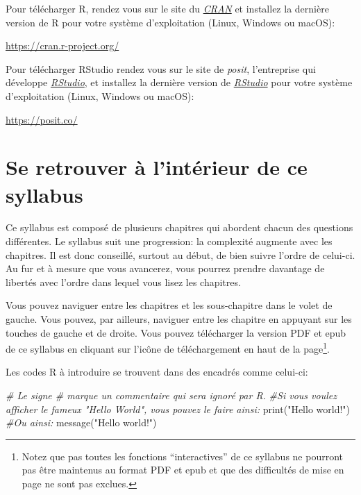 \documentclass[
]{book}
\newenvironment{Shaded}{\begin{snugshade}}{\end{snugshade}}
\newcommand{\CommentTok}[1]{\textcolor[rgb]{0.56,0.35,0.01}{\textit{#1}}}
\newcommand{\FunctionTok}[1]{\textcolor[rgb]{0.00,0.00,0.00}{#1}}
\newcommand{\NormalTok}[1]{#1}
\newcommand{\StringTok}[1]{\textcolor[rgb]{0.31,0.60,0.02}{#1}}
\begin{document}
Pour télécharger R, rendez vous sur le site du \href{https://cran.r-project.org/}{\emph{CRAN}} et installez la dernière version de R pour votre système d'exploitation (Linux, Windows ou macOS):

\url{https://cran.r-project.org/}

Pour télécharger RStudio rendez vous sur le site de \emph{posit}, l'entreprise qui développe \href{https://posit.co/}{\emph{RStudio}}, et installez la dernière version de \href{https://posit.co/}{\emph{RStudio}} pour votre système d'exploitation (Linux, Windows ou macOS):

\url{https://posit.co/}

\hypertarget{se-retrouver-uxe0-lintuxe9rieur-de-ce-syllabus}{%
\section{Se retrouver à l'intérieur de ce syllabus}\label{se-retrouver-uxe0-lintuxe9rieur-de-ce-syllabus}}

Ce syllabus est composé de plusieurs chapitres qui abordent chacun des questions différentes. Le syllabus suit une progression: la complexité augmente avec les chapitres. Il est donc conseillé, surtout au début, de bien suivre l'ordre de celui-ci. Au fur et à mesure que vous avancerez, vous pourrez prendre davantage de libertés avec l'ordre dans lequel vous lisez les chapitres.

Vous pouvez naviguer entre les chapitres et les sous-chapitre dans le volet de gauche. Vous pouvez, par ailleurs, naviguer entre les chapitre en appuyant sur les touches de gauche et de droite. Vous pouvez télécharger la version PDF et epub de ce syllabus en cliquant sur l'icône de téléchargement en haut de la page\footnote{Notez que pas toutes les fonctions ``interactives'' de ce syllabus ne pourront pas être maintenus au format PDF et epub et que des difficultés de mise en page ne sont pas exclues.}.

Les codes R à introduire se trouvent dans des encadrés comme celui-ci:

\begin{Shaded}
\begin{Highlighting}[]
\CommentTok{\# Le signe \# marque un commentaire qui sera ignoré par R.}
\CommentTok{\#Si vous voulez afficher le fameux "Hello World", vous pouvez le faire ainsi:}
\FunctionTok{print}\NormalTok{(}\StringTok{"Hello world!"}\NormalTok{)}
\CommentTok{\#Ou ainsi:}
\FunctionTok{message}\NormalTok{(}\StringTok{"Hello world!"}\NormalTok{)}
\end{Highlighting}
\end{Shaded}
\end{document}
